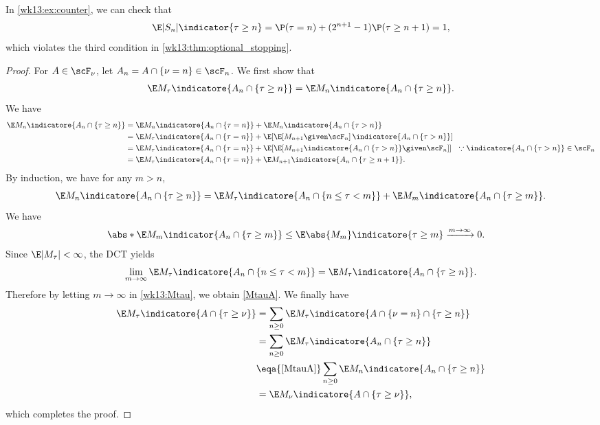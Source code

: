 \documentclass[../aipt.tex]{subfiles}
\begin{document}
In \cref{wk13:ex:counter}, we can check that 
\begin{align*}
\E |S_n|\indicator{\tau\geq n} = \P(\tau=n) + (2^{n+1}-1)\P(\tau\geq n+1)= 1,
\end{align*}
which violates the third condition in \cref{wk13:thm:optional_stopping}.

\begin{proof}
For $A \in \scF_\nu$, let $A_n = A \cap \{\nu = n\} \in \scF_n $.  We first show that 
\begin{align}\label{MtauA}
\E M_\tau \indicatore{A_n \cap \{\tau \geq n\}} = \E M_n \indicatore{A_n \cap \{\tau \geq n\}}.
\end{align}
We have
\begin{align*}
\E M_n \indicatore{A_n \cap \{\tau \geq n\}}
&= \E M_n \indicatore{A_n \cap \{\tau = n\}} + \E M_n \indicatore{A_n \cap \{\tau > n\}} \\
&= \E M_\tau \indicatore{A_n \cap \{\tau = n\}} + \E[ {\E[M_{n+1} \given \scF_n]}\, \indicatore{A_n \cap \{\tau > n\}}] \\
&= \E M_\tau \indicatore{A_n \cap \{\tau = n\}} + \E[ {\E[M_{n+1}\indicatore{A_n \cap \{\tau > n\}} \given \scF_n]} ]\ \ \because \indicatore{A_n \cap \{\tau > n\}} \in \scF_n\\
&= \E M_\tau \indicatore{A_n \cap \{\tau = n\}} + \E M_{n+1} \indicatore{A_n \cap \{\tau \geq n+1\}}.
\end{align*}
By induction, we have for any $m>n$,
\begin{align}
\E M_n \indicatore{A_n \cap \{\tau \geq n\}}
= \E M_\tau \indicatore{A_n \cap \{n \leq \tau < m\}} + \E M_m \indicatore{A_n \cap \{\tau \geq m\}}.\label{wk13:Mtau}
\end{align}
We have
\begin{align*}
&\abs*{\E M_m \indicator{A_n \cap \{\tau \geq m\}}} \leq \E \abs{M_m} \indicatore{\tau \geq m} \xrightarrow{m\to\infty} 0.
\end{align*}
Since $\E |M_\tau| < \infty$, the DCT yields
\begin{align*}
\lim_{m \to \infty} \E M_\tau \indicatore{A_n \cap \{n \leq \tau < m\}}
= \E M_\tau \indicatore{A_n \cap \{\tau \geq n\}}.
\end{align*}
Therefore by letting $m\to\infty$ in \cref{wk13:Mtau}, we obtain \cref{MtauA}. We finally have
\begin{align*}
\E M_\tau \indicatore{A \cap \{\tau \geq \nu\}}
&= \sum_{n \geq 0} \E M_\tau \indicatore{A \cap \{\nu = n\} \cap \{\tau \geq n\}} \\
&= \sum_{n \geq 0} \E M_\tau \indicatore{A_n \cap \{\tau \geq n\}} \\
&\eqa{\cref{MtauA}} \sum_{n \geq 0} \E M_n \indicatore{A_n \cap \{\tau \geq n\}} \\
&= \E M_\nu \indicatore{A \cap \{\tau \geq \nu\}},
\end{align*}
which completes the proof.
\end{proof}
\end{document}
